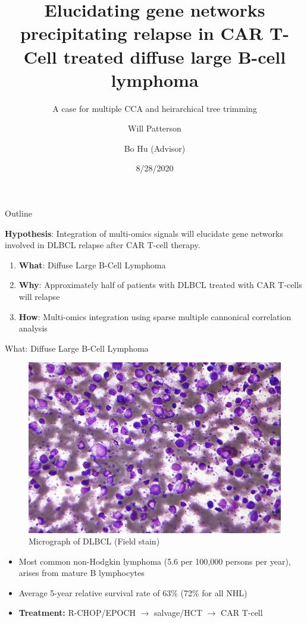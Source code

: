 \documentclass[ignorenonframetext,]{beamer}
\title{Elucidating gene networks precipitating relapse in CAR T-Cell treated
diffuse large B-cell lymphoma}
\subtitle{A case for multiple CCA and heirarchical tree trimming}
\author{Will Patterson \and Bo Hu (Advisor)}
\date{8/28/2020}
\begin{document}
\frame{\titlepage}

\begin{frame}{Outline}
\protect\hypertarget{outline}{}

\textbf{Hypothesis}: Integration of multi-omics signals will elucidate
gene networks involved in DLBCL relapse after CAR T-cell therapy.

\begin{enumerate}
\item
  \textbf{What}: Diffuse Large B-Cell Lymphoma
\item
  \textbf{Why}: Approximately half of patients with DLBCL treated with
  CAR T-cells will relapse
\item
  \textbf{How}: Multi-omics integration using sparse multiple cannonical
  correlation analysis
\end{enumerate}

\end{frame}

\begin{frame}{What: Diffuse Large B-Cell Lymphoma}
\protect\hypertarget{what-diffuse-large-b-cell-lymphoma}{}

\begin{figure}

{\centering \includegraphics[width=0.45\linewidth]{images/dlbcl_stain} 

}

\caption{Micrograph of DLBCL (Field stain)}\label{fig:unnamed-chunk-1}
\end{figure}

\begin{itemize}
\item
  Most common non-Hodgkin lymphoma (5.6 per 100,000 persons per year),
  arises from mature B lymphocytes
\item
  Average 5-year relative survival rate of 63\% (72\% for all NHL)
\item
  \textbf{Treatment:} R-CHOP/EPOCH \(\rightarrow\) salvage/HCT
  \(\rightarrow\) CAR T-cell
\end{itemize}

\end{frame}
\end{document}
